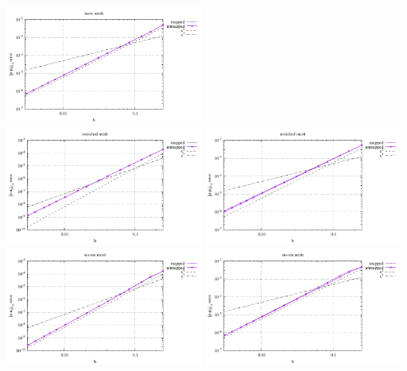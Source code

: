 \begin{center}
\includegraphics[width=6.5cm]{python_codes/fieldstone_76/results/bench3/straight/errors_P_mt3.pdf}\\
\includegraphics[width=6.5cm]{python_codes/fieldstone_76/results/bench3/straight/errors_V_mt4.pdf}
\includegraphics[width=6.5cm]{python_codes/fieldstone_76/results/bench3/straight/errors_P_mt4.pdf}\\
\includegraphics[width=6.5cm]{python_codes/fieldstone_76/results/bench3/straight/errors_V_mt5.pdf}
\includegraphics[width=6.5cm]{python_codes/fieldstone_76/results/bench3/straight/errors_P_mt5.pdf}\\

\end{center}
